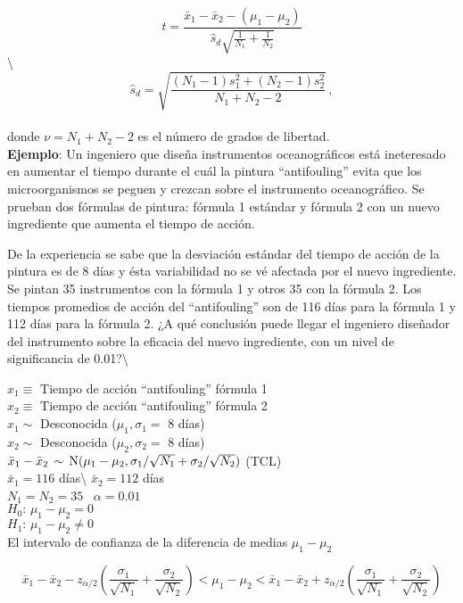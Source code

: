 \documentclass[
]{agujournal2019}
\begin{document}
\[t=\frac{\bar{x}_1-\bar{x}_2-(\mu_1-\mu_2)}
         {\hat{s}_d\sqrt{\frac{1}{N_1}+\frac{1}{N_2}}}\]
\textbackslash{}
\[\hat{s}_d=\sqrt{\frac{(N_1-1)s^2_1 + (N_2-1)s^2_2}{N_1+N_2-2}}\,,\]\\

donde \(\nu=N_1+N_2-2\) es el número de grados de libertad.\\

\textbf{Ejemplo}: Un ingeniero que diseña instrumentos oceanográficos
está ineteresado en aumentar el tiempo durante el cuál la pintura
``antifouling'' evita que los microorganismos se peguen y crezcan sobre
el instrumento oceanográfico. Se prueban dos fórmulas de pintura:
fórmula 1 estándar y fórmula 2 con un nuevo ingrediente que aumenta el
tiempo de acción.

De la experiencia se sabe que la desviación estándar del tiempo de
acción de la pintura es de 8 días y ésta variabilidad no se vé afectada
por el nuevo ingrediente. Se pintan 35 instrumentos con la fórmula 1 y
otros 35 con la fórmula 2. Los tiempos promedios de acción del
``antifouling'' son de 116 días para la fórmula 1 y 112 días para la
fórmula 2. ¿A qué conclusión puede llegar el ingeniero diseñador del
instrumento sobre la eficacia del nuevo ingrediente, con un nivel de
significancia de 0.01?\textbackslash{}

\(x_1\equiv\) Tiempo de acción ``antifouling'' fórmula 1\\

\(x_2\equiv\) Tiempo de acción ``antifouling'' fórmula 2\\
\(x_1\sim\) Desconocida (\(\mu_1,\sigma_1=\) 8 días)\\
\(x_2\sim\) Desconocida (\(\mu_2,\sigma_2=\) 8 días)\\
\(\bar{x}_1-\bar{x}_2\,\sim\,{\rm N}(\mu_1-\mu_2,\sigma_1/\sqrt{N_1} + \sigma_2/\sqrt{N_2})\)
(TCL)\\
\(\bar{x}_1=116\) días\textbackslash{} \(\bar{x}_2=112\) días\\
\(N_1=N_2=35\)~ \(\alpha=0.01\)\\
\(H_0:\,\mu_1 - \mu_2 =0\)\\
\(H_1:\,\mu_1 - \mu_2 \neq0\)\\

El intervalo de confianza de la diferencia de medias \(\mu_1-\mu_2\)

\[\bar{x}_1-\bar{x}_2-z_{\alpha/2} \left(
   \frac{\sigma_1}{\sqrt{N_1}} + \frac{\sigma_2}{\sqrt{N_2}}\right)<
   \mu_1-\mu_2 <
   \bar{x}_1-\bar{x}_2+z_{\alpha/2} \left(
   \frac{\sigma_1}{\sqrt{N_1}} + \frac{\sigma_2}{\sqrt{N_2}}\right)\]
\end{document}
